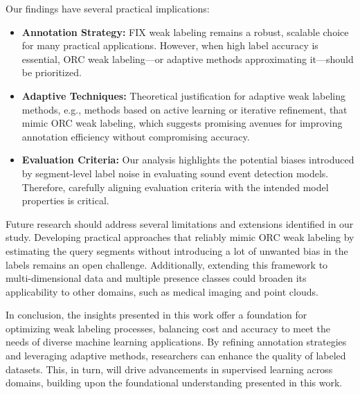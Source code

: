 Our findings have several practical implications:
\begin{itemize}
    \item \textbf{Annotation Strategy:} FIX weak labeling remains a robust, scalable choice for many practical applications. However, when high label accuracy is essential, ORC weak labeling—or adaptive methods approximating it—should be prioritized.
    \item \textbf{Adaptive Techniques:} Theoretical justification for adaptive weak labeling methods, e.g., methods based on active learning or iterative refinement, that mimic ORC weak labeling, which suggests promising avenues for improving annotation efficiency without compromising accuracy.
    \item \textbf{Evaluation Criteria:} Our analysis highlights the potential biases introduced by segment-level label noise in evaluating sound event detection models. Therefore, carefully aligning evaluation criteria with the intended model properties is critical.
\end{itemize}

Future research should address several limitations and extensions identified in our study. Developing practical approaches that reliably mimic ORC weak labeling by estimating the query segments without introducing a lot of unwanted bias in the labels remains an open challenge. Additionally, extending this framework to multi-dimensional data and multiple presence classes could broaden its applicability to other domains, such as medical imaging and point clouds.

In conclusion, the insights presented in this work offer a foundation for optimizing weak labeling processes, balancing cost and accuracy to meet the needs of diverse machine learning applications. By refining annotation strategies and leveraging adaptive methods, researchers can enhance the quality of labeled datasets. This, in turn, will drive advancements in supervised learning across domains, building upon the foundational understanding presented in this work.

